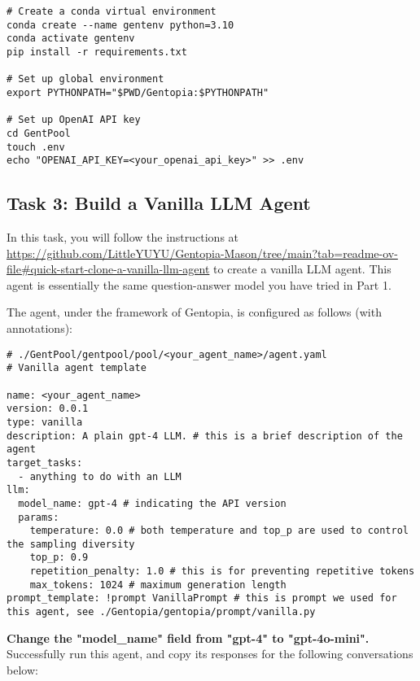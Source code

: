 \documentclass[11pt,addpoints,answers]{exam}
\begin{document}
\begin{questions}
\begin{lstlisting}
# Create a conda virtual environment
conda create --name gentenv python=3.10
conda activate gentenv
pip install -r requirements.txt

# Set up global environment
export PYTHONPATH="$PWD/Gentopia:$PYTHONPATH"

# Set up OpenAI API key
cd GentPool
touch .env
echo "OPENAI_API_KEY=<your_openai_api_key>" >> .env
\end{lstlisting} 

\bigskip
\subsection*{Task 3: Build a Vanilla LLM Agent}
In this task, you will follow the instructions at \url{https://github.com/LittleYUYU/Gentopia-Mason/tree/main?tab=readme-ov-file#quick-start-clone-a-vanilla-llm-agent} to create a vanilla LLM agent. This agent is essentially the same question-answer model you have tried in Part 1.

The agent, under the framework of Gentopia, is configured as follows (with annotations):
\begin{lstlisting}
# ./GentPool/gentpool/pool/<your_agent_name>/agent.yaml
# Vanilla agent template

name: <your_agent_name>
version: 0.0.1
type: vanilla
description: A plain gpt-4 LLM. # this is a brief description of the agent
target_tasks:
  - anything to do with an LLM
llm:
  model_name: gpt-4 # indicating the API version
  params:
    temperature: 0.0 # both temperature and top_p are used to control the sampling diversity
    top_p: 0.9
    repetition_penalty: 1.0 # this is for preventing repetitive tokens
    max_tokens: 1024 # maximum generation length
prompt_template: !prompt VanillaPrompt # this is prompt we used for this agent, see ./Gentopia/gentopia/prompt/vanilla.py
\end{lstlisting}

    \question[10] \textbf{Change the "model\_name" field from "gpt-4" to "gpt-4o-mini".} Successfully run this agent, and copy its responses for the following conversations below:
    

\end{questions}
\end{document}
